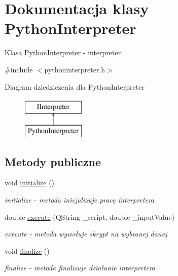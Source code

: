 \hypertarget{class_python_interpreter}{\section{Dokumentacja klasy Python\+Interpreter}
\label{class_python_interpreter}
}


Klasa \hyperlink{class_python_interpreter}{Python\+Interpreter} -\/ interpreter.  




{\ttfamily \#include $<$pythoninterpreter.\+h$>$}

Diagram dziedziczenia dla Python\+Interpreter\begin{figure}[H]
\begin{center}
\leavevmode
\includegraphics[height=2.000000cm]{class_python_interpreter}
\end{center}
\end{figure}
\subsection*{Metody publiczne}
\begin{DoxyCompactItemize}
\item 
\hypertarget{class_python_interpreter_ae44c1714d8fe0f955369de9f3e5a0e31}{void \hyperlink{class_python_interpreter_ae44c1714d8fe0f955369de9f3e5a0e31}{initialize} ()}\label{class_python_interpreter_ae44c1714d8fe0f955369de9f3e5a0e31}

\begin{DoxyCompactList}\small\item\em initialize -\/ metoda inicjalizuje pracę interpretera \end{DoxyCompactList}\item 
double \hyperlink{class_python_interpreter_a93e0c709989ec0d3cb427dbd77e5a9fb}{execute} (Q\+String \+\_\+script, double \+\_\+input\+Value)
\begin{DoxyCompactList}\small\item\em execute -\/ metoda wywołuje skrypt na wybranej danej \end{DoxyCompactList}\item 
\hypertarget{class_python_interpreter_acdc9d0c1c3231ee74f467cc4d41f891c}{void \hyperlink{class_python_interpreter_acdc9d0c1c3231ee74f467cc4d41f891c}{finalize} ()}\label{class_python_interpreter_acdc9d0c1c3231ee74f467cc4d41f891c}

\begin{DoxyCompactList}\small\item\em finalize -\/ metoda finalizuje działanie interpretera \end{DoxyCompactList}\end{DoxyCompactItemize}


